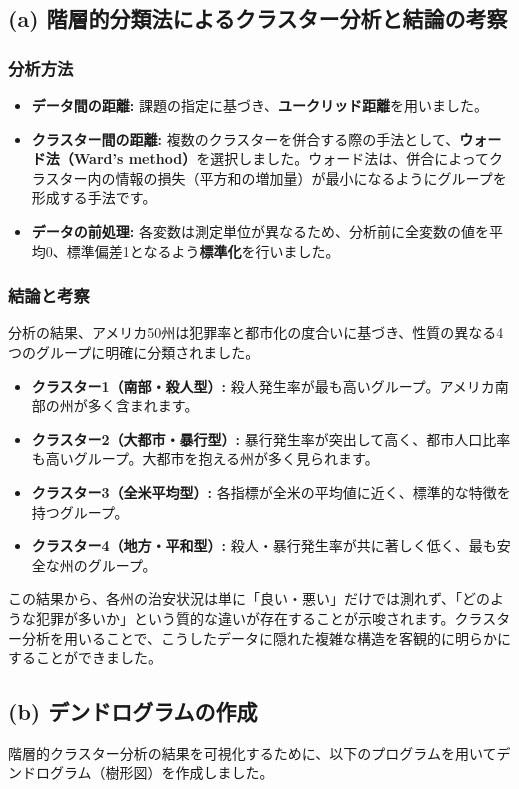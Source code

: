 \documentclass{article}
\begin{document}
\subsection{(a) 階層的分類法によるクラスター分析と結論の考察}

\subsubsection*{分析方法}
\begin{itemize}
    \item \textbf{データ間の距離:} 課題の指定に基づき、\textbf{ユークリッド距離}を用いました。
    \item \textbf{クラスター間の距離:} 複数のクラスターを併合する際の手法として、\textbf{ウォード法（Ward's method）}を選択しました。ウォード法は、併合によってクラスター内の情報の損失（平方和の増加量）が最小になるようにグループを形成する手法です。
    \item \textbf{データの前処理:} 各変数は測定単位が異なるため、分析前に全変数の値を平均0、標準偏差1となるよう\textbf{標準化}を行いました。
\end{itemize}

\subsubsection*{結論と考察}
分析の結果、アメリカ50州は犯罪率と都市化の度合いに基づき、性質の異なる4つのグループに明確に分類されました。
\begin{itemize}
    \item \textbf{クラスター1（南部・殺人型）:} 殺人発生率が最も高いグループ。アメリカ南部の州が多く含まれます。
    \item \textbf{クラスター2（大都市・暴行型）:} 暴行発生率が突出して高く、都市人口比率も高いグループ。大都市を抱える州が多く見られます。
    \item \textbf{クラスター3（全米平均型）:} 各指標が全米の平均値に近く、標準的な特徴を持つグループ。
    \item \textbf{クラスター4（地方・平和型）:} 殺人・暴行発生率が共に著しく低く、最も安全な州のグループ。
\end{itemize}
この結果から、各州の治安状況は単に「良い・悪い」だけでは測れず、「どのような犯罪が多いか」という質的な違いが存在することが示唆されます。クラスター分析を用いることで、こうしたデータに隠れた複雑な構造を客観的に明らかにすることができました。


\subsection{(b) デンドログラムの作成}
階層的クラスター分析の結果を可視化するために、以下のプログラムを用いてデンドログラム（樹形図）を作成しました。
\end{document}
